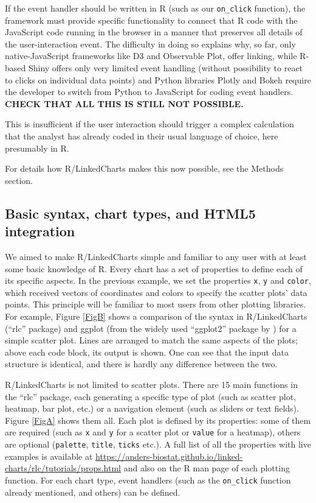 \documentclass[twocolumn,10pt]{article}
\begin{document}
If the event handler should be written in R (such as our \texttt{on_click} function), the framework must provide specific functionality to connect that R code with the JavaScript code running in the browser in a manner that preserves all details of the user-interaction event. The difficulty in doing so explains why, so far, only native-JavaScript frameworks like D3 and Observable Plot, offer linking, while R-based Shiny offers only very limited event handling (without possibility to react to clicks on individual data points) and Python libraries Plotly and Bokeh require the developer to switch from Python to JavaScript for coding event handlers. \textbf{CHECK THAT ALL THIS IS STILL NOT POSSIBLE.}

This is insufficient if the user interaction should trigger a complex calculation that the analyst has already coded in their usual language of choice, here presumably in R.

For details how R/LinkedCharts makes this now possible, see the Methods section.

\subsection{Basic syntax, chart types, and HTML5 integration}

We aimed to make R/LinkedCharts simple and familiar to any user with at least some basic knowledge of R. Every chart has a set of properties to define each of its specific aspects. In the previous example, we set the properties \texttt{x}, \texttt{y} and \texttt{color}, which received vectors of coordinates and colors to specify the scatter plots' data points. This principle will be familiar to most users from other plotting libraries. For example, Figure \ref{FigB} shows a comparison of the syntax in R/LinkedCharts (``rlc'' package) and ggplot (from the widely used ``ggplot2'' package by \citet{wickham_2016}) for a simple scatter plot. Lines are arranged to match the same aspects of the plots; above each code block, its output is shown. One can see that the input data structure is identical, and there is hardly any difference between the two.

R/LinkedCharts is not limited to scatter plots. There are 15 main functions in the ``rlc'' package, each generating a specific type of plot (such as scatter plot, heatmap, bar plot, etc.) or a navigation element (such as sliders or text fields). Figure \ref{FigA} shows them all. Each plot is defined by its properties: some of them are required (such as \texttt{x} and \texttt{y} for a scatter plot or \texttt{value} for a heatmap), others are optional (\texttt{palette}, \texttt{title}, \texttt{ticks} etc.). A full list of all the properties with live examples is available at \url{https://anders-biostat.github.io/linked-charts/rlc/tutorials/props.html} and also on the R man page of each plotting function. For each chart type, event handlers (such as the \texttt{on_click} function already mentioned, and others) can be defined.
\end{document}
